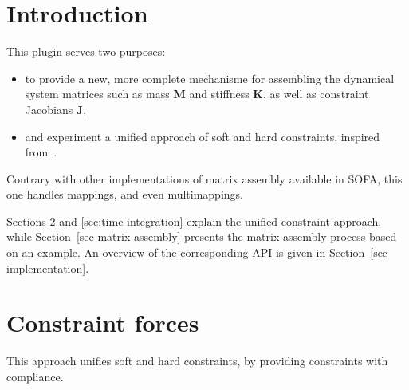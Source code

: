 \newcommand{\vect}[1]{\mathbf{#1}}
\newcommand{\mat}[1]{\mathbf{#1}}

\newcommand{\pos}{\vect{x}}
\newcommand{\dx}{\vect{\Delta x}}
\newcommand{\xcur}{\vect{x}_{n}}
\newcommand{\xnext}{\vect{x}_{n+1}}
\newcommand{\vel}{\vect{v}}
\newcommand{\dv}{\vect{\Delta v}}
\newcommand{\vcur}{\vect{v}_{n}}
\newcommand{\vnext}{\vect v_{n+1}}
\newcommand{\acc}{\vect{a}}
\newcommand{\force}{\vect{f}}
\newcommand{\forcext}{\vect{f}_{ext}} 
\newcommand{\lam}{\vect{\lambda}}
\newcommand{\lcur}{\lam_{n}}
\newcommand{\lnext}{\lam_{n+1}}
\newcommand{\avlam}{\bar{\lam}}
\newcommand{\fcur}{\vect{f}_{n}}
\newcommand{\fnext}{\vect f_{n+1}}
\newcommand{\M}{\mat M}
\newcommand{\Minv}{\mat M^{-1}}
\newcommand{\Mbinv}{\bar{\mat M}^{-1}}
\renewcommand{\P}{\mat P}
\newcommand{\I}{\mat I}
\newcommand{\J}{\mat J}
\newcommand{\Jt}{\mat J^T}
\newcommand{\C}{\mat C}
\newcommand{\D}{\mat D}
\newcommand{\K}{\mat K}
\newcommand{\violation}{ \phi}
\newcommand{\dviolation}{\dot \violation}
\newcommand{\violcur}{\violation_{n}}
\newcommand{\dviolcur}{\dot \violcur}
\newcommand{\violnext}{\violation_{n+1}}
\newcommand{\dviolnext}{\dot \violation_{n+1}}
\newcommand{\cmp}{c}
\newcommand{\dampingratio}{d}

\section{Introduction}
This plugin serves two purposes:
\begin{itemize}
 \item to provide a new, more complete mechanisme for assembling the dynamical system matrices such as mass $\M$ and stiffness $\K$, as well as constraint Jacobians $\J$,
 \item and experiment a unified approach of soft and hard constraints, inspired from~\cite{servin2006interactive}.
\end{itemize}
Contrary with other implementations of matrix assembly available in SOFA, this one handles mappings, and even multimappings.

Sections \ref{sec constraint forces} and \ref{sec:time integration} explain the unified constraint approach, while Section~\ref{sec matrix assembly} presents the matrix assembly process based on an example. An overview of the corresponding API is given in Section~\ref{sec implementation}. 

\section{Constraint forces} \label{sec constraint forces}
This approach unifies soft and hard constraints, by providing constraints with compliance. 
